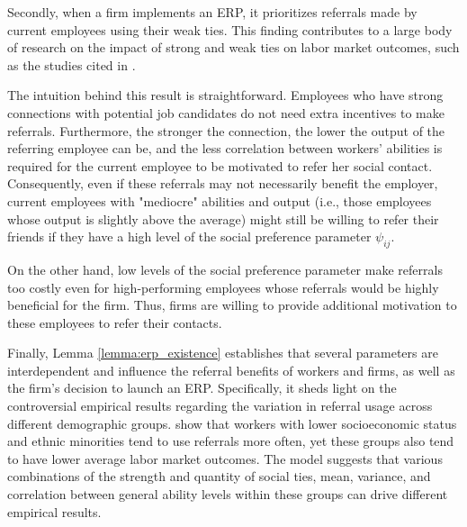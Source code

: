 \documentclass[12pt]{article}
\begin{document}

Secondly, when a firm implements an ERP, it prioritizes referrals made by current employees using their weak ties. This finding contributes to a large body of research on the impact of strong and weak ties on labor market outcomes, such as the studies cited in \cite{lin1981social, montgomery1992job, montgomery1994weak, granovetter1995getting, yakubovich2005weak, lester2021heterogeneous}.

The intuition behind this result is straightforward. Employees who have strong connections with potential job candidates do not need extra incentives to make referrals. Furthermore, the stronger the connection, the lower the output of the referring employee can be, and the less correlation between workers' abilities is required for the current employee to be motivated to refer her social contact. Consequently, even if these referrals may not necessarily benefit the employer, current employees with "mediocre" abilities and output (i.e., those employees whose output is slightly above the average) might still be willing to refer their friends if they have a high level of the social preference parameter $\psi_{ij}$.

On the other hand, low levels of the social preference parameter make referrals too costly even for high-performing employees whose referrals would be highly beneficial for the firm. Thus, firms are willing to provide additional motivation to these employees to refer their contacts. 

Finally, Lemma \ref{lemma:erp_existence} establishes that several parameters are interdependent and influence the referral benefits of workers and firms, as well as the firm's decision to launch an ERP. Specifically, it sheds light on the controversial empirical results regarding the variation in referral usage across different demographic groups. \cite{holzer1987job, calvo2004effects, loury2006some, pellizzari2010friends,  lalanne2021social} show that workers with lower socioeconomic status and ethnic minorities tend to use referrals more often, yet these groups also tend to have lower average labor market outcomes. The model suggests that various combinations of the strength and quantity of social ties, mean, variance, and correlation between general ability levels within these groups can drive different empirical results.
\end{document}
